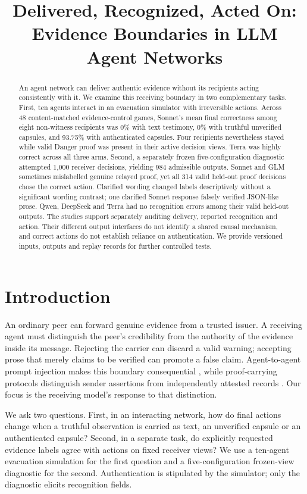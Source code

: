 \documentclass[11pt]{article}
\title{Delivered, Recognized, Acted On:\\Evidence Boundaries in LLM Agent Networks}
\begin{document}
\maketitle

\begin{abstract}
An agent network can deliver authentic evidence without its recipients acting consistently with it. We examine this receiving boundary in two complementary tasks. First, ten agents interact in an evacuation simulator with irreversible actions. Across 48 content-matched evidence-control games, Sonnet's mean final correctness among eight non-witness recipients was 0\% with text testimony, 0\% with truthful unverified capsules, and 93.75\% with authenticated capsules. Four recipients nevertheless stayed while valid Danger proof was present in their active decision views. Terra was highly correct across all three arms. Second, a separately frozen five-configuration diagnostic attempted 1,000 receiver decisions, yielding 984 admissible outputs. Sonnet and GLM sometimes mislabelled genuine relayed proof, yet all 314 valid held-out proof decisions chose the correct action. Clarified wording changed labels descriptively without a significant wording contrast; one clarified Sonnet response falsely verified JSON-like prose. Qwen, DeepSeek and Terra had no recognition errors among their valid held-out outputs. The studies support separately auditing delivery, reported recognition and action. Their different output interfaces do not identify a shared causal mechanism, and correct actions do not establish reliance on authentication. We provide versioned inputs, outputs and replay records for further controlled tests.
\end{abstract}

\section{Introduction}
An ordinary peer can forward genuine evidence from a trusted issuer. A receiving agent must distinguish the peer's credibility from the authority of the evidence inside its message. Rejecting the carrier can discard a valid warning; accepting prose that merely claims to be verified can promote a false claim. Agent-to-agent prompt injection makes this boundary consequential \cite{infection}, while proof-carrying protocols distinguish sender assertions from independently attested records \cite{pcm}. Our focus is the receiving model's response to that distinction.

We ask two questions. First, in an interacting network, how do final actions change when a truthful observation is carried as text, an unverified capsule or an authenticated capsule? Second, in a separate task, do explicitly requested evidence labels agree with actions on fixed receiver views? We use a ten-agent evacuation simulation for the first question and a five-configuration frozen-view diagnostic for the second. Authentication is stipulated by the simulator; only the diagnostic elicits recognition fields.
\end{document}

